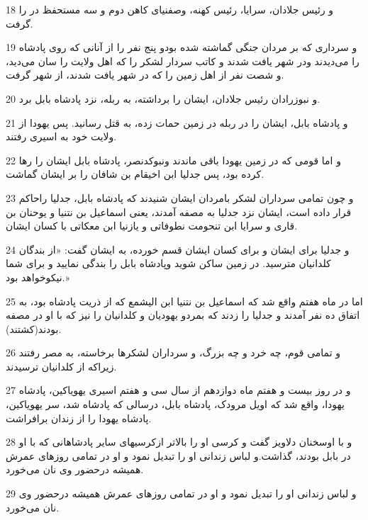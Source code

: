 \par 18 و رئیس جلادان، سرایا، رئیس کهنه، وصفنیای کاهن دوم و سه مستحفظ در را گرفت.
\par 19 و سرداری که بر مردان جنگی گماشته شده بودو پنج نفر را از آنانی که روی پادشاه را می‌دیدند ودر شهر یافت شدند و کاتب سردار لشکر را که اهل ولایت را سان می‌دید، و شصت نفر از اهل زمین را که در شهر یافت شدند، از شهر گرفت.
\par 20 و نبوزرادان رئیس جلادان، ایشان را برداشته، به ربله، نزد پادشاه بابل برد. 
\par 21 و پادشاه بابل، ایشان را در ربله در زمین حمات زده، به قتل رسانید. پس یهودا از ولایت خود به اسیری رفتند.
\par 22 و اما قومی که در زمین یهودا باقی ماندند ونبوکدنصر، پادشاه بابل ایشان را رها کرده بود، پس جدلیا ابن اخیقام بن شافان را بر ایشان گماشت.
\par 23 و چون تمامی سرداران لشکر بامردان ایشان شنیدند که پادشاه بابل، جدلیا راحاکم قرار داده است، ایشان نزد جدلیا به مصفه آمدند، یعنی اسماعیل بن نتنیا و یوحنان بن قاری و سرایا ابن تنحومت نطوفاتی و یازنیا ابن معکاتی با کسان ایشان.
\par 24 و جدلیا برای ایشان و برای کسان ایشان قسم خورده، به ایشان گفت: «از بندگان کلدانیان مترسید. در زمین ساکن شوید وپادشاه بابل را بندگی نمایید و برای شما نیکوخواهد بود.»
\par 25 اما در ماه هفتم واقع شد که اسماعیل بن نتنیا ابن الیشمع که از ذریت پادشاه بود، به اتفاق ده نفر آمدند و جدلیا را زدند که بمردو یهودیان و کلدانیان را نیز که با او در مصفه بودند(کشتند).
\par 26 و تمامی قوم، چه خرد و چه بزرگ، و سرداران لشکرها برخاسته، به مصر رفتند زیراکه از کلدانیان ترسیدند.
\par 27 و در روز بیست و هفتم ماه دوازدهم از سال سی و هفتم اسیری یهویاکین، پادشاه یهودا، واقع شد که اویل مرودک، پادشاه بابل، درسالی که پادشاه شد، سر یهویاکین، پادشاه یهودا را از زندان برافراشت.
\par 28 و با اوسخنان دلاویز گفت و کرسی او را بالاتر ازکرسیهای سایر پادشاهانی که با او در بابل بودند، گذاشت.و لباس زندانی او را تبدیل نمود و او در تمامی روزهای عمرش همیشه درحضور وی نان می‌خورد.
\par 29 و لباس زندانی او را تبدیل نمود و او در تمامی روزهای عمرش همیشه درحضور وی نان می‌خورد.


